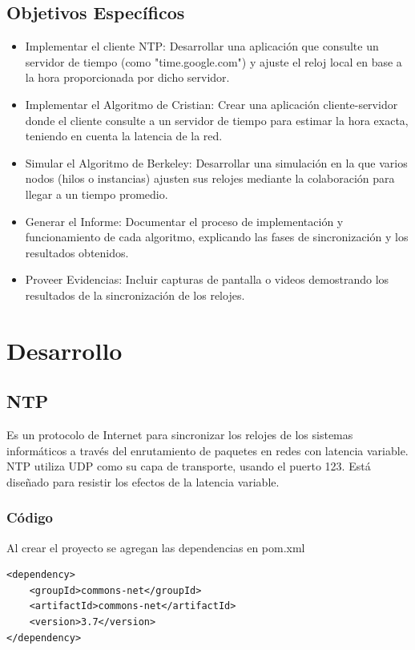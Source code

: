 \documentclass[a4paper,12pt]{report}
\begin{document}
\section{Objetivos Específicos}
\begin{itemize}
    \item Implementar el cliente NTP: Desarrollar una aplicación que consulte un servidor de tiempo (como "time.google.com") y ajuste el reloj local en base a la hora proporcionada por dicho servidor.
    \item Implementar el Algoritmo de Cristian: Crear una aplicación cliente-servidor donde el cliente consulte a un servidor de tiempo para estimar la hora exacta, teniendo en cuenta la latencia de la red.
    \item Simular el Algoritmo de Berkeley: Desarrollar una simulación en la que varios nodos (hilos o instancias) ajusten sus relojes mediante la colaboración para llegar a un tiempo promedio.
    \item Generar el Informe: Documentar el proceso de implementación y funcionamiento de cada algoritmo, explicando las fases de sincronización y los resultados obtenidos.
    \item Proveer Evidencias: Incluir capturas de pantalla o videos demostrando los resultados de la sincronización de los relojes.
\end{itemize}

\chapter{Desarrollo}
\section{NTP}
Es un protocolo de Internet para sincronizar los relojes de los sistemas informáticos a través del enrutamiento de paquetes en redes con latencia variable. NTP utiliza UDP como su capa de transporte, usando el puerto 123. Está diseñado para resistir los efectos de la latencia variable. \cite{ntp}

\subsection{Código}
Al crear el proyecto se agregan las dependencias en pom.xml
\begin{verbatim}
<dependency>
    <groupId>commons-net</groupId>
    <artifactId>commons-net</artifactId>
    <version>3.7</version>
</dependency>
\end{verbatim}
\end{document}
